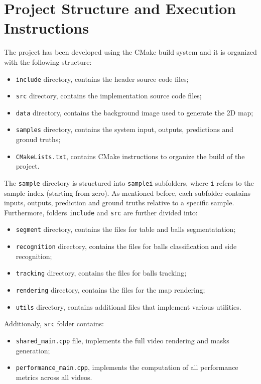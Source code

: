 \section{Project Structure and Execution Instructions}


The project has been developed using the CMake build system and it is organized with the
following structure:
\begin{itemize}
    \item \verb|include| directory, contains the header source code files;
    \item \verb|src| directory, contains the implementation source code files;
    \item \verb|data| directory, contains the background image used to generate the 2D map;
    \item \verb|samples| directory, contains the system input, outputs, predictions and gronud truths;
    \item \verb|CMakeLists.txt|, contains CMake instructions to organize the build of the project. 
\end{itemize}

\noindent
The \verb|sample| directory is structured into \verb|samplei| subfolders, where \verb|i| refers to the sample index (starting from zero).
As mentioned before, each subfolder contains inputs, outputs, prediction and ground truths relative to a specific sample.
\\
\noindent
Furthermore, folders \verb|include| and \verb|src| are further divided into:
\begin{itemize}
    \item \verb|segment| directory, contains the files for table and balls segmentatation;
    \item \verb|recognition| directory, contains the files for balls classification and side recognition;
    \item \verb|tracking| directory, contains the files for balls tracking;
    \item \verb|rendering| directory, contains the files for the map rendering;
    \item \verb|utils| directory, contains additional files that implement various utilities.
\end{itemize}

\noindent
Additionaly, \verb|src| folder contains:
\begin{itemize}
    \item \verb|shared_main.cpp| file, implements the full video rendering and masks generation;
    \item \verb|performance_main.cpp|, implements the computation of all performance metrics across all videos.
\end{itemize}

